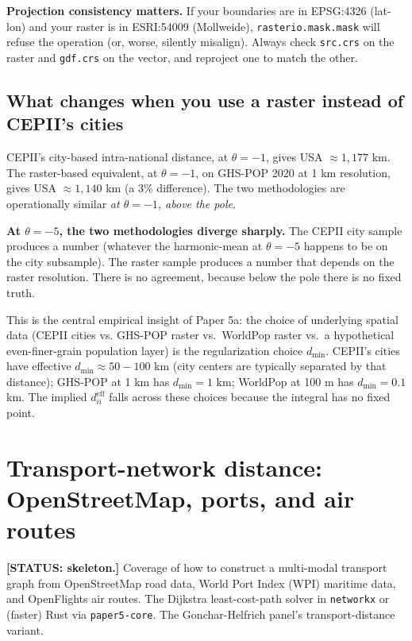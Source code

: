 \documentclass[11pt,letterpaper,oneside]{book}
\theoremstyle{definition}
\theoremstyle{remark}
\newcommand{\eff}{\mathrm{eff}}
\begin{document}
\begin{caveat}
\textbf{Projection consistency matters.} If your boundaries are in
EPSG:4326 (lat-lon) and your raster is in ESRI:54009 (Mollweide),
\texttt{rasterio.mask.mask} will refuse the operation (or, worse,
silently misalign). Always check \texttt{src.crs} on the raster and
\texttt{gdf.crs} on the vector, and reproject one to match the other.
\end{caveat}

\section{What changes when you use a raster instead of CEPII's cities}

CEPII's city-based intra-national distance, at $\theta = -1$, gives
USA $\approx 1{,}177$ km. The raster-based equivalent, at $\theta = -1$,
on GHS-POP 2020 at 1 km resolution, gives USA $\approx 1{,}140$ km
(a 3\% difference). The two methodologies are operationally similar
\emph{at $\theta = -1$, above the pole}.

\textbf{At $\theta = -5$, the two methodologies diverge sharply.}
The CEPII city sample produces a number (whatever the harmonic-mean
at $\theta = -5$ happens to be on the city subsample). The raster
sample produces a number that depends on the raster resolution.
There is no agreement, because below the pole there is no fixed
truth.

This is the central empirical insight of Paper 5a: the choice of
underlying spatial data (CEPII cities vs. GHS-POP raster vs.\ WorldPop
raster vs.\ a hypothetical even-finer-grain population layer) is the
regularization choice $d_{\min}$. CEPII's cities have effective
$d_{\min} \approx 50-100$ km (city centers are typically separated by
that distance); GHS-POP at 1 km has $d_{\min} = 1$ km; WorldPop at
100 m has $d_{\min} = 0.1$ km. The implied $d_{ii}^{\eff}$ falls
across these choices because the integral has no fixed point.

\chapter{Transport-network distance: OpenStreetMap, ports, and air routes}

\textbf{[STATUS: skeleton.]} Coverage of how to construct a multi-modal
transport graph from OpenStreetMap road data, World Port Index (WPI)
maritime data, and OpenFlights air routes. The Dijkstra least-cost-path
solver in \texttt{networkx} or (faster) Rust via \texttt{paper5-core}.
The Gonchar-Helfrich panel's transport-distance variant.
\end{document}
